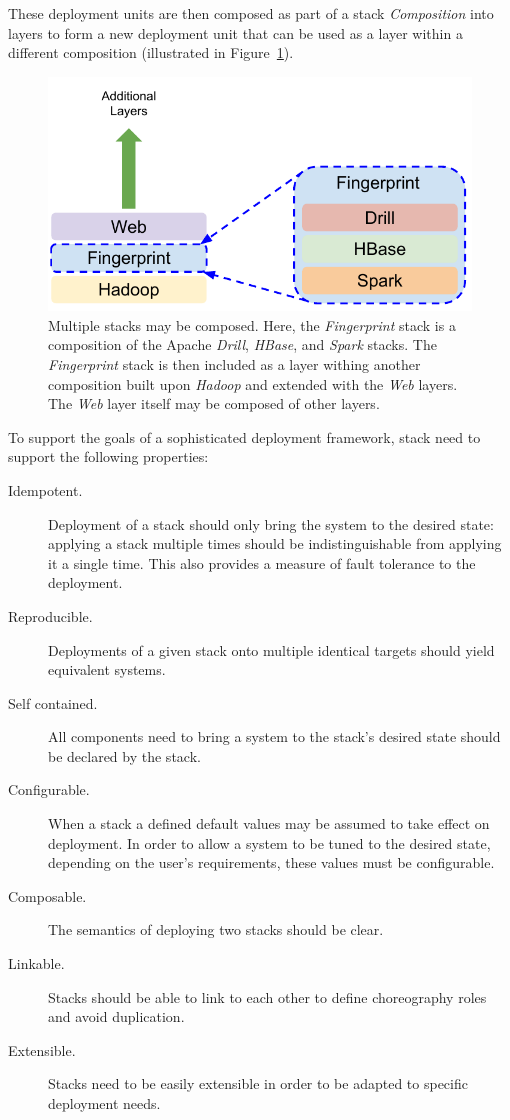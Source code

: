 These deployment units are then composed as part of a stack {\it
  Composition} into layers to form a new deployment unit that can be
used as a layer within a different composition (illustrated in 
Figure~\ref{F:stack-composition}).


\begin{figure}
\centering
\includegraphics[width=1\columnwidth]{images/cloudmesh-stack-composition.pdf}
\caption{Multiple stacks may be composed. Here, the
  {\it Fingerprint} stack is a composition of the Apache
  {\it Drill}, {\it HBase}, and {\it Spark}
  stacks. The {\it Fingerprint} stack is then included as a layer withing
  another composition built upon {\it Hadoop} and extended with the
  {\it Web} layers. The {\it Web} layer itself may be composed
  of other layers.
  \label{F:stack-composition}}
\end{figure}

To support the goals of a sophisticated deployment framework, stack
need to support the following properties:

\begin{description}
\item [Idempotent.]  Deployment of a stack should only bring the
  system to the desired state: applying a stack multiple times should
  be indistinguishable from applying it a single time. This also
  provides a measure of fault tolerance to the deployment.
\item [Reproducible.] Deployments of a given stack onto multiple
  identical targets should yield equivalent systems.
\item [Self contained.] All components need to bring a system to the
  stack's desired state should be declared by the stack.
\item [Configurable.] When a stack a defined default values may be
  assumed to take effect on deployment. In order to allow a system to
  be tuned to the desired state, depending on the user's requirements,
  these values must be configurable.
\item [Composable.] The semantics of deploying two stacks should be clear.
\item [Linkable.] Stacks should be able to link to each other to
  define choreography roles and avoid duplication.
\item [Extensible.] Stacks need to be easily extensible in order to be
  adapted to specific deployment needs.
\end{description}

